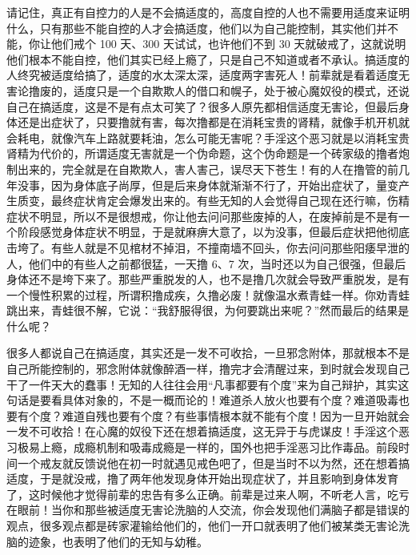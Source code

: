 请记住，真正有自控力的人是不会搞适度的，高度自控的人也不需要用适度来证明什么，只有那些不能自控的人才会搞适度，他们以为自己能控制，其实他们并不能，你让他们戒个 100 天、300 天试试，也许他们不到 30 天就破戒了，这就说明他们根本不能自控，他们其实已经上瘾了，只是自己不知道或者不承认。搞适度的人终究被适度给搞了，适度的水太深太深，适度两字害死人！前辈就是看着适度无害论撸废的，适度只是一个自欺欺人的借口和幌子，处于被心魔奴役的模式，还说自己在搞适度，这是不是有点太可笑了？很多人原先都相信适度无害论，但最后身体还是出症状了，只要撸就有害，每次撸都是在消耗宝贵的肾精，就像手机开机就会耗电，就像汽车上路就要耗油，怎么可能无害呢？手淫这个恶习就是以消耗宝贵肾精为代价的，所谓适度无害就是一个伪命题，这个伪命题是一个砖家级的撸者炮制出来的，完全就是在自欺欺人，害人害己，误尽天下苍生！有的人在撸管的前几年没事，因为身体底子尚厚，但是后来身体就渐渐不行了，开始出症状了，量变产生质变，最终症状肯定会爆发出来的。有些无知的人会觉得自己现在还行嘛，伤精症状不明显，所以不是很想戒，你让他去问问那些废掉的人，在废掉前是不是有一个阶段感觉身体症状不明显，于是就麻痹大意了，以为没事，但最后症状把他彻底击垮了。有些人就是不见棺材不掉泪，不撞南墙不回头，你去问问那些阳痿早泄的人，他们中的有些人之前都很猛，一天撸 6、7 次，当时还以为自己很强，但最后身体还不是垮下来了。那些严重脱发的人，也不是撸几次就会导致严重脱发，是有一个慢性积累的过程，所谓积撸成疾，久撸必废！就像温水煮青蛙一样。你劝青蛙跳出来，青蛙很不解，它说：“我舒服得很，为何要跳出来呢？”然而最后的结果是什么呢？

很多人都说自己在搞适度，其实还是一发不可收拾，一旦邪念附体，那就根本不是自己所能控制的，邪念附体就像醉酒一样，撸完才会清醒过来，到时就会发现自己干了一件天大的蠢事！无知的人往往会用“凡事都要有个度”来为自己辩护，其实这句话是要看具体对象的，不是一概而论的！难道杀人放火也要有个度？难道吸毒也要有个度？难道自残也要有个度？有些事情根本就不能有个度！因为一旦开始就会一发不可收拾！在心魔的奴役下还在想着搞适度，这无异于与虎谋皮！手淫这个恶习极易上瘾，成瘾机制和吸毒成瘾是一样的，国外也把手淫恶习比作毒品。前段时间一个戒友就反馈说他在初一时就遇见戒色吧了，但是当时不以为然，还在想着搞适度，于是就没戒，撸了两年他发现身体开始出现症状了，并且影响到身体发育了，这时候他才觉得前辈的忠告有多么正确。前辈是过来人啊，不听老人言，吃亏在眼前！当你和那些被适度无害论洗脑的人交流，你会发现他们满脑子都是错误的观点，很多观点都是砖家灌输给他们的，他们一开口就表明了他们被某类无害论洗脑的迹象，也表明了他们的无知与幼稚。


